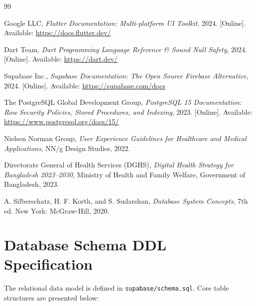 \documentclass[11pt,a4paper,oneside]{report}
\begin{document}
\begin{thebibliography}{99}

Google LLC, \emph{Flutter Documentation: Multi-platform UI Toolkit}, 2024. [Online]. Available: \url{https://docs.flutter.dev/}

Dart Team, \emph{Dart Programming Language Reference \& Sound Null Safety}, 2024. [Online]. Available: \url{https://dart.dev/}

Supabase Inc., \emph{Supabase Documentation: The Open Source Firebase Alternative}, 2024. [Online]. Available: \url{https://supabase.com/docs}

The PostgreSQL Global Development Group, \emph{PostgreSQL 15 Documentation: Row Security Policies, Stored Procedures, and Indexing}, 2023. [Online]. Available: \url{https://www.postgresql.org/docs/15/}

Nielsen Norman Group, \emph{User Experience Guidelines for Healthcare and Medical Applications}, NN/g Design Studies, 2022.

Directorate General of Health Services (DGHS), \emph{Digital Health Strategy for Bangladesh 2023--2030}, Ministry of Health and Family Welfare, Government of Bangladesh, 2023.

A. Silberschatz, H. F. Korth, and S. Sudarshan, \emph{Database System Concepts}, 7th ed. New York: McGraw-Hill, 2020.

\end{thebibliography}

\appendix
\chapter{Database Schema DDL Specification}
\label{app:schema}

The relational data model is defined in \texttt{supabase/schema.sql}. Core table structures are presented below:
\end{document}
